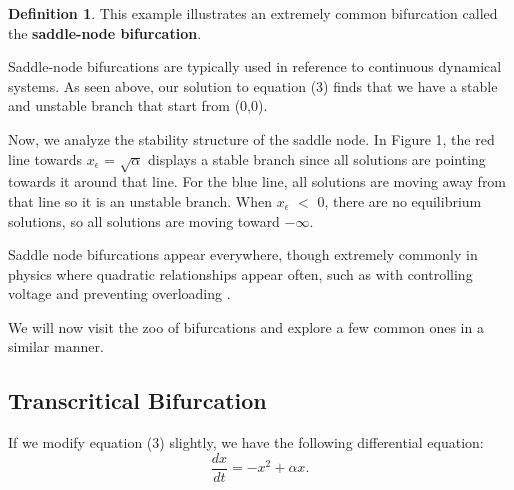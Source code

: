 \documentclass{article}
\theoremstyle{definition}
\newtheorem{definition}{Definition}[section]
\theoremstyle{remark}
\newenvironment{problem}[2][Example]{\begin{trivlist}
\item[\hskip \labelsep {\bfseries #1}\hskip \labelsep {\bfseries #2.}]}{\end{trivlist}}
\begin{document}
\begin{definition}
    This example illustrates an extremely common bifurcation called the \textbf{saddle-node bifurcation}.
\end{definition}
Saddle-node bifurcations are typically used in reference to continuous dynamical systems. As seen above, our solution to equation (3) finds that we have a stable and unstable branch that start from (0,0). 

Now, we analyze the stability structure of the saddle node. In Figure 1, the red line towards $x_\epsilon$ = $\sqrt{\alpha}$ displays a stable branch since all solutions are pointing towards it around that line. For the blue line, all solutions are moving away from that line so it is an unstable branch. When $x_\epsilon$ $<$ 0, there are no equilibrium solutions, so all solutions are moving toward  $-\infty$. 

Saddle node bifurcations appear everywhere, though extremely commonly in physics where quadratic relationships appear often, such as with controlling voltage and preventing overloading \cite{Dobson1992}. 

We will now visit the zoo of bifurcations and explore a few common ones in a similar manner. 
\subsection{Transcritical Bifurcation}
\begin{problem}{2.3.1}
If we modify equation (3) slightly, we have the following differential equation: 
\begin{equation}\label{example 2.3}
    \frac{dx}{dt} = -x^2 + \alpha x .
\end{equation}
\end{problem}
\end{document}
